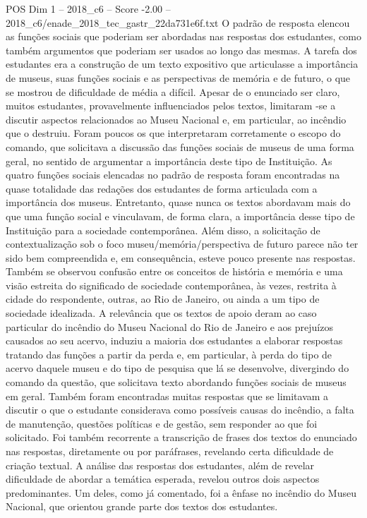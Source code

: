 \begin{textsample}{POS Dim 1 – 2018\_c6 – Score -2.00 – 2018\_c6/enade\_2018\_tec\_gastr\_22da731e6f.txt}
O padrão de resposta elencou as funções sociais que poderiam ser abordadas nas respostas dos estudantes, como também argumentos que poderiam ser usados ao longo das mesmas.
A tarefa dos estudantes era a construção de um texto expositivo que articulasse a importância de museus, suas funções sociais e as perspectivas de memória e de futuro, o que se mostrou de dificuldade de média a difícil.
Apesar de o enunciado ser claro, muitos estudantes, provavelmente influenciados pelos textos, limitaram -se a discutir aspectos relacionados ao Museu Nacional e, em particular, ao incêndio que o destruiu.
Foram poucos os que interpretaram corretamente o escopo do comando, que solicitava a discussão das funções sociais de museus de uma forma geral, no sentido de argumentar a importância deste tipo de Instituição.
As quatro funções sociais elencadas no padrão de resposta foram encontradas na quase totalidade das redações dos estudantes de forma articulada com a importância dos museus.
Entretanto, quase nunca os textos abordavam mais do que uma função social e vinculavam, de forma clara, a importância desse tipo de Instituição para a sociedade contemporânea.
Além disso, a solicitação de contextualização sob o foco museu/memória/perspectiva de futuro parece não ter sido bem compreendida e, em consequência, esteve pouco presente nas respostas.
Também se observou confusão entre os conceitos de história e memória e uma visão estreita do significado de sociedade contemporânea, às vezes, restrita à cidade do respondente, outras, ao Rio de Janeiro, ou ainda a um tipo de sociedade idealizada.
A relevância que os textos de apoio deram ao caso particular do incêndio do Museu Nacional do Rio de Janeiro e aos prejuízos causados ao seu acervo, induziu a maioria dos estudantes a elaborar respostas tratando das funções a partir da perda e, em particular, à perda do tipo de acervo daquele museu e do tipo de pesquisa que lá se desenvolve, divergindo do comando da questão, que solicitava texto abordando funções sociais de museus em geral.
Também foram encontradas muitas respostas que se limitavam a discutir o que o estudante considerava como possíveis causas do incêndio, a falta de manutenção, questões políticas e de gestão, sem responder ao que foi solicitado.
Foi também recorrente a transcrição de frases dos textos do enunciado nas respostas, diretamente ou por paráfrases, revelando certa dificuldade de criação textual.
A análise das respostas dos estudantes, além de revelar dificuldade de abordar a temática esperada, revelou outros dois aspectos predominantes.
Um deles, como já comentado, foi a ênfase no incêndio do Museu Nacional, que orientou grande parte dos textos dos estudantes.

\end{textsample}
